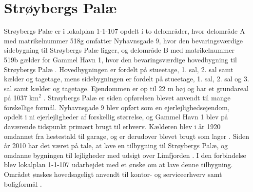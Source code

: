 \section{Strøybergs Palæ}
Strøybergs Palæ er i lokalplan 1-1-107 opdelt i to delområder, hvor delområde A med matrikelnummer 518g omfatter Nyhavnsgade 9, hvor den bevaringsværdige sidebygning til Strøybergs Palæ ligger, og delområde B med matrikelnummer 519b gælder for Gammel Havn 1, hvor den bevaringsværdige hovedbygning til Strøybergs Palæ \citep[ s. 7]{lokalplan}. Hovedbygningen er fordelt på stueetage, 1. sal, 2. sal samt kælder og tagetage, mens sidebygningen er fordelt på stueetage, 1. sal, 2. sal og 3. sal samt kælder og tagetage. Ejendommen er op til 22 m høj og har et grundareal på 1037 $\text{km}^2$ \citep{byggesagen}.
\newline \indent{     }  Strøybergs Palæ er siden opførelsen blevet anvendt til mange forskellige formål. Nyhavnsgade 9 blev opført som en ejerlejlighedsejendom, opdelt i ni ejerlejligheder af forskellig størrelse, og Gammel Havn 1 blev på daværende tidspunkt primært brugt til erhverv. Kælderen blev i år 1920 omdannet fra hestestald til garage, og er derudover blevet brugt som lager \citep{byggesagen}.
\newline \indent{     }  Siden år 2010 har det været på tale, at lave en tilbygning til Strøybergs Palæ, og omdanne bygningen til lejligheder med udsigt over Limfjorden \citep{Calum}. I den forbindelse blev lokalplan 1-1-107 udarbejdet med et ønske om at lave denne tilbygning. Området ønskes hovedsageligt anvendt til kontor- og serviceerhverv samt boligformål \citep[ s. 7]{lokalplan}.